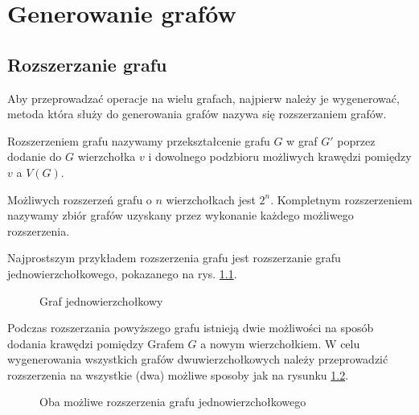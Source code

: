 \chapter{Generowanie grafów}

\section{Rozszerzanie grafu}
Aby przeprowadzać operacje na wielu grafach, najpierw należy je wygenerować, metoda która służy do generowania grafów nazywa się rozszerzaniem grafów. 
\begin{definition} Rozszerzeniem grafu nazywamy przekształcenie grafu $G$ w graf $G'$ poprzez dodanie do $G$ wierzchołka $v$ i dowolnego podzbioru możliwych krawędzi pomiędzy $v$ a $V(G)$.
\end{definition}
Możliwych rozszerzeń grafu o $n$ wierzchołkach jest $2^n$. Kompletnym rozszerzeniem nazywamy zbiór grafów uzyskany przez wykonanie każdego możliwego rozszerzenia.

Najprostszym przykładem rozszerzenia grafu jest rozszerzanie grafu jednowierzchołkowego, pokazanego na rys. \ref{grafjednowierzcholkowy}.
\begin{figure}[H]
  \centering
   \caption{Graf jednowierzchołkowy}
   \label{grafjednowierzcholkowy}
\end{figure}


Podczas rozszerzania powyższego grafu istnieją dwie możliwości na sposób dodania krawędzi pomiędzy Grafem $G$ a nowym wierzchołkiem. W celu wygenerowania wszystkich grafów dwuwierzchołkowych należy przeprowadzić rozszerzenia na wszystkie (dwa) możliwe sposoby jak na rysunku \ref{rozszerzeniedwuwierzcholkowe}.
\begin{figure}[H]
  
  \centering
   \hspace{15mm}

   \caption{Oba możliwe rozszerzenia grafu jednowierzchołkowego}
   \label{rozszerzeniedwuwierzcholkowe}
\end{figure}

